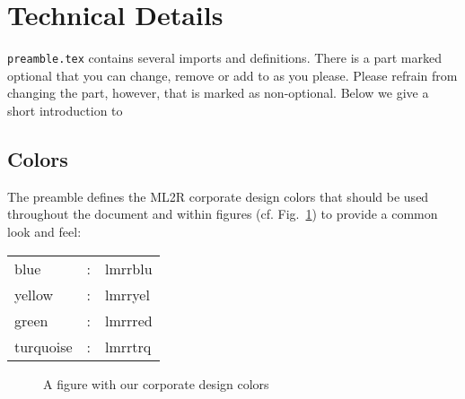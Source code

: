 \documentclass[fleqn,svgnames]{lamarrreport}
\begin{document}
\section{Technical Details}
\verb+preamble.tex+ contains several imports and definitions. 
There is a part marked optional that you can change, remove or add to as you please. 
Please refrain from changing the part, however, that is marked as non-optional.
Below we give a short introduction to 

\subsection{Colors}
The preamble defines the ML2R corporate design colors that should be used throughout the document and within figures (cf. Fig.~\ref{colors}) to provide a common look and feel:

\vspace{0.5em}
\begin{center}
\begin{tabular}{lcl}
\textcolor{lmrrblu}{blue} & : & \textcolor{lmrrblu}{lmrrblu} \\
\textcolor{lmrryel}{yellow} & : & \textcolor{lmrryel}{lmrryel} \\
\textcolor{lmrrred}{green} & : & \textcolor{lmrrred}{lmrrred} \\
\textcolor{lmrrtrq}{turquoise} & : & \textcolor{lmrrtrq}{lmrrtrq} \\
 \end{tabular} 
\end{center}

\begin{figure}
\caption{A figure with our corporate design colors}
\label{colors}
\end{figure}
\end{document}
